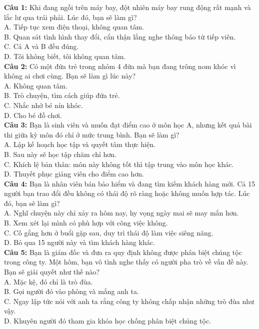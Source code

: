 \begin{multicols}{2}
\noindent
\textbf{Câu 1:} Khi đang ngồi trên máy bay, đột nhiên máy bay rung động rất mạnh và lắc lư qua trái phải. Lúc đó, bạn sẽ làm gì? \\
A. Tiếp tục xem điện thoại, không quan tâm. \\
B. Quan sát tình hình thay đổi, cẩn thận lắng nghe thông báo từ tiếp viên. \\
C. Cả A và B đều đúng. \\
D. Tôi không biết, tôi không quan tâm. \\

\textbf{Câu 2:} Có một đứa trẻ trong nhóm 4 đứa mà bạn đang trông nom khóc vì không ai chơi cùng. Bạn sẽ làm gì lúc này? \\
A. Không quan tâm. \\
B. Trò chuyện, tìm cách giúp đứa trẻ. \\
C. Nhắc nhở bé nín khóc. \\
D. Cho bé đồ chơi. \\

\textbf{Câu 3:} Bạn là sinh viên và muốn đạt điểm cao ở môn học A, nhưng kết quả bài thi giữa kỳ môn đó chỉ ở mức trung bình. Bạn sẽ làm gì? \\
A. Lập kế hoạch học tập và quyết tâm thực hiện. \\
B. Sau này sẽ học tập chăm chỉ hơn. \\
C. Khích lệ bản thân: môn này không tốt thì tập trung vào môn học khác. \\
D. Thuyết phục giảng viên cho điểm cao hơn. \\

\textbf{Câu 4:} Bạn là nhân viên bán bảo hiểm và đang tìm kiếm khách hàng mới. Cả 15 người bạn trao đổi đều không có thái độ rõ ràng hoặc không muốn hợp tác. Lúc đó, bạn sẽ làm gì? \\
A. Nghĩ chuyện này chỉ xảy ra hôm nay, hy vọng ngày mai sẽ may mắn hơn. \\
B. Xem xét lại mình có phù hợp với công việc không. \\
C. Cố gắng hơn ở buổi gặp sau, duy trì thái độ làm việc siêng năng. \\
D. Bỏ qua 15 người này và tìm khách hàng khác. \\

\textbf{Câu 5:} Bạn là giám đốc và đưa ra quy định không được phân biệt chủng tộc trong công ty. Một hôm, bạn vô tình nghe thấy có người pha trò về vấn đề này. Bạn sẽ giải quyết như thế nào? \\
A. Mặc kệ, đó chỉ là trò đùa. \\
B. Gọi người đó vào phòng và mắng anh ta. \\
C. Ngay lập tức nói với anh ta rằng công ty không chấp nhận những trò đùa như vậy. \\
D. Khuyên người đó tham gia khóa học chống phân biệt chủng tộc. \\


\end{multicols}
